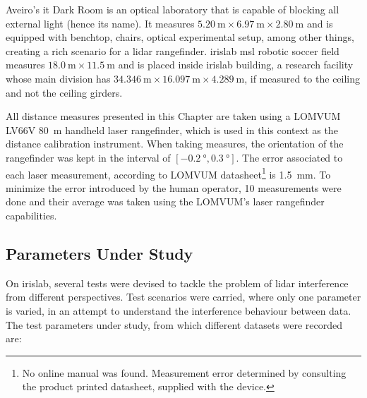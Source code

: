 Aveiro's \ac{it} Dark Room is an optical laboratory that is capable of blocking all external light (hence its name). It measures $\SI{5.20}{\meter} \times \SI{6.97}{\meter} \times \SI{2.80}{\meter}$ and is equipped with benchtop, chairs, optical experimental setup, among other things, creating a rich scenario for a \ac{lidar} rangefinder. 
\ac{irislab} \ac{msl} robotic soccer field measures $\SI{18.0}{\meter} \times \SI{11.5}{\meter}$ and is placed inside \ac{irislab} building, a research facility whose main division has $\SI{34.346}{\meter} \times \SI{16.097}{\meter} \times \SI{4.289}{\meter}$, if measured to the ceiling and not the ceiling girders. 

All distance measures presented in this Chapter are taken using a LOMVUM LV66V \SI{80}{\meter} handheld laser rangefinder, which is used in this context as the distance calibration instrument. When taking measures, the orientation of the rangefinder was kept in the interval of $[\SI{-0.2}{\degree}, \SI{0.3}{\degree}]$. The error associated to each laser measurement, according to LOMVUM datasheet\footnote{No online manual was found. Measurement error determined by consulting the product printed datasheet, supplied with the device.} is \SI{1.5}{\milli\meter}. To minimize the error introduced by the human operator, 10 measurements were done and their average was taken using the LOMVUM's laser rangefinder capabilities.


\subsection{Parameters Under Study}
\label{subsec:lidar-interference:parameters-under-test}
On \ac{irislab}, several tests were devised to tackle the problem of \ac{lidar} interference from different perspectives. Test scenarios were carried, where only one parameter is varied, in an attempt to understand the interference behaviour between data. The test parameters under study, from which different datasets were recorded are:

